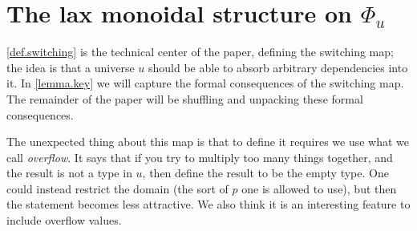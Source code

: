 \documentclass[11pt, one side, article]{memoir}
\theoremstyle{definition}
\theoremstyle{plain}
\newcommand{\0}{\textsf{0}}
\newcommand{\1}{\tn{\textsf{1}}}
\begin{document}
\section{The lax monoidal structure on $\Phi_u$}

\cref{def.switching} is the technical center of the paper, defining the switching map; the idea is that a universe $u$ should be able to absorb arbitrary dependencies into it. In \cref{lemma.key} we will capture the formal consequences of the switching map. The remainder of the paper will be shuffling and unpacking these formal consequences. 

The unexpected thing about this map is that to define it requires we use what we call \emph{overflow}. It says that if you try to multiply too many things together, and the result is not a type in $u$, then define the result to be the empty type. One could instead restrict the domain (the sort of $p$ one is allowed to use), but then the statement becomes less attractive. We also think it is an interesting feature to include overflow values.
\end{document}
